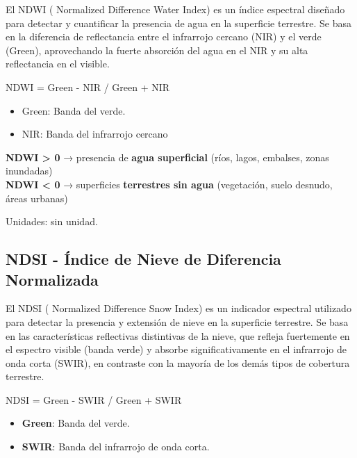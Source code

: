 \documentclass[
]{book}
\providecommand{\tightlist}{%
  \setlength{\itemsep}{0pt}\setlength{\parskip}{0pt}}
\begin{document}
El NDWI ( Normalized Difference Water Index) es un índice espectral diseñado para detectar y cuantificar la presencia de agua en la superficie terrestre. Se basa en la diferencia de reflectancia entre el infrarrojo cercano (NIR) y el verde (Green), aprovechando la fuerte absorción del agua en el NIR y su alta reflectancia en el visible.

NDWI = Green - NIR / Green + NIR\hspace{0pt}

\begin{itemize}
\tightlist
\item
  Green: Banda del verde.\\
\item
  NIR: Banda del infrarrojo cercano
\end{itemize}

\textbf{NDWI \textgreater{} 0} → presencia de \textbf{agua superficial} (ríos, lagos, embalses, zonas inundadas)\\
\textbf{NDWI \textless{} 0} → superficies \textbf{terrestres sin agua} (vegetación, suelo desnudo, áreas urbanas)

Unidades: sin unidad.

\subsection{\texorpdfstring{\textbf{NDSI} - Índice de Nieve de Diferencia Normalizada}{NDSI - Índice de Nieve de Diferencia Normalizada}}\label{ndsi---uxedndice-de-nieve-de-diferencia-normalizada}

El NDSI ( Normalized Difference Snow Index) es un indicador espectral utilizado para detectar la presencia y extensión de nieve en la superficie terrestre. Se basa en las características reflectivas distintivas de la nieve, que refleja fuertemente en el espectro visible (banda verde) y absorbe significativamente en el infrarrojo de onda corta (SWIR), en contraste con la mayoría de los demás tipos de cobertura terrestre.

NDSI = Green - SWIR / Green + SWIR\hspace{0pt}

\begin{itemize}
\tightlist
\item
  \textbf{Green}: Banda del verde.\\
\item
  \textbf{SWIR}: Banda del infrarrojo de onda corta.
\end{itemize}
\end{document}
